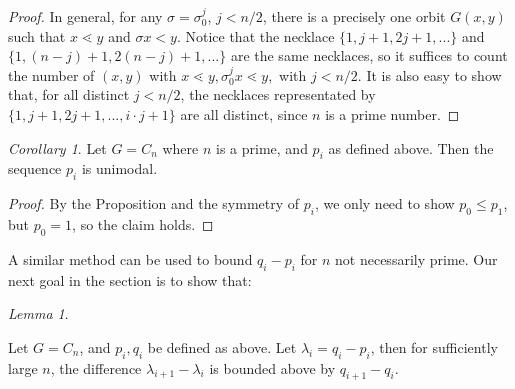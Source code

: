 \documentclass[10 pt]{amsart}
\theoremstyle{plain}
\theoremstyle{definition}
\theoremstyle{remark}
\numberwithin{equation}{section}
\newtheorem{cor}[thm]{Corollary}
\newtheorem{lem}[thm]{Lemma}
\theoremstyle{remark}
\begin{document}
\begin{proof}

  
In general, for any $\sigma = \sigma_0^{j}$, $j < n/2$, there is a precisely one orbit $G(x,y)$ such that $x \lessdot y$ and $\sigma x < y$.  Notice that the necklace $\{1, j+1,2j+1, ...  \}$ and $\{1, (n-j)+1, 2(n-j)+1, ... \}$ are the same necklaces, so it suffices to count the number of $(x, y)$ with $x \lessdot y,\sigma_0^jx \lessdot y,$ with $j < n/2$. It is also easy to show that, for all distinct $j < n/2$, the necklaces representated by $\{1, j+1, 2j+1, ..., i\cdot j+1\}$ are all distinct, since $n$ is a prime number. 
\end{proof}

\begin{cor}{\label{cor:cyclic_prime_unimodal}} Let $G = C_n$ where $n$ is a prime, and $p_i$ as defined above. Then the sequence $p_i$ is unimodal. 
\end{cor}

\begin{proof}
By the Proposition and the symmetry of $p_i$, we only need to show $p_0 \le p_1$, but $p_0 = 1$, so the claim holds.
\end{proof}

A similar method can be used to bound $q_i - p_i$ for $n$ not necessarily prime.  Our next goal in the section is to show that:

\begin{lem}{\label{lem:cyclicgeneral}}

Let $G = C_n$, and $p_i, q_i$ be defined as above. Let $\lambda_i = q_i - p_i$, then for sufficiently large $n$, the difference $\lambda_{i+1} - \lambda_{i}$ is bounded above by  $q_{i+1} - q_i$. \end{lem}
\end{document}
